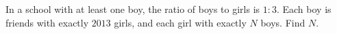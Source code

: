 In a school with at least one boy, the ratio of boys to girls is $1:3$. Each boy is friends with exactly $2013$ girls, and each girl with exactly $N$ boys. Find $N$.

